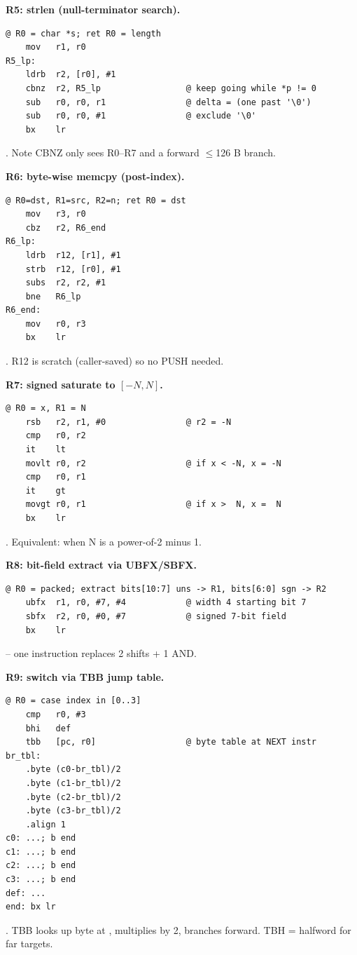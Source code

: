 \textbf{R5: strlen (null-terminator search).}
\begin{lstlisting}
@ R0 = char *s; ret R0 = length
    mov   r1, r0
R5_lp:
    ldrb  r2, [r0], #1
    cbnz  r2, R5_lp                 @ keep going while *p != 0
    sub   r0, r0, r1                @ delta = (one past '\0')
    sub   r0, r0, #1                @ exclude '\0'
    bx    lr
\end{lstlisting}
. Note CBNZ only sees R0--R7 and a forward $\le$126 B branch.

\textbf{R6: byte-wise memcpy (post-index).}
\begin{lstlisting}
@ R0=dst, R1=src, R2=n; ret R0 = dst
    mov   r3, r0
    cbz   r2, R6_end
R6_lp:
    ldrb  r12, [r1], #1
    strb  r12, [r0], #1
    subs  r2, r2, #1
    bne   R6_lp
R6_end:
    mov   r0, r3
    bx    lr
\end{lstlisting}
. R12 is scratch (caller-saved) so no PUSH needed.

\textbf{R7: signed saturate to $[-N,N]$.}
\begin{lstlisting}
@ R0 = x, R1 = N
    rsb   r2, r1, #0                @ r2 = -N
    cmp   r0, r2
    it    lt
    movlt r0, r2                    @ if x < -N, x = -N
    cmp   r0, r1
    it    gt
    movgt r0, r1                    @ if x >  N, x =  N
    bx    lr
\end{lstlisting}
. Equivalent:  when N is a power-of-2 minus 1.

\textbf{R8: bit-field extract via UBFX/SBFX.}
\begin{lstlisting}
@ R0 = packed; extract bits[10:7] uns -> R1, bits[6:0] sgn -> R2
    ubfx  r1, r0, #7, #4            @ width 4 starting bit 7
    sbfx  r2, r0, #0, #7            @ signed 7-bit field
    bx    lr
\end{lstlisting}
  -- one instruction replaces 2 shifts + 1 AND.

\textbf{R9: switch via TBB jump table.}
\begin{lstlisting}
@ R0 = case index in [0..3]
    cmp   r0, #3
    bhi   def
    tbb   [pc, r0]                  @ byte table at NEXT instr
br_tbl:
    .byte (c0-br_tbl)/2
    .byte (c1-br_tbl)/2
    .byte (c2-br_tbl)/2
    .byte (c3-br_tbl)/2
    .align 1
c0: ...; b end
c1: ...; b end
c2: ...; b end
c3: ...; b end
def: ...
end: bx lr
\end{lstlisting}
. TBB looks up byte at , multiplies by 2, branches forward. TBH = halfword for far targets.

